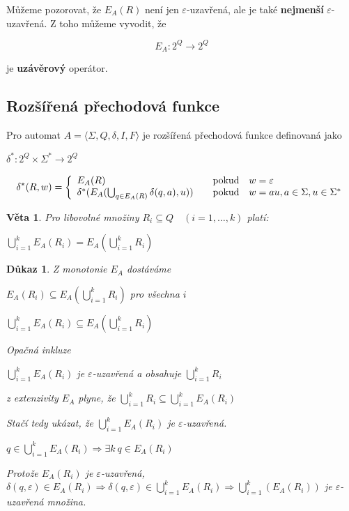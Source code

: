 \documentclass[10pt, a4paper, titlepage]{article}
\theoremstyle{note}
\newtheorem{veta}{Věta}
\newtheorem{dukaz}{Důkaz}
\begin{document}
Můžeme pozorovat, že $E_A(R)$ není jen $\varepsilon$-uzavřená, ale je také \textbf{nejmenší} $\varepsilon$-uzavřená. Z toho můžeme vyvodit, že 

$$E_A:2^Q \rightarrow 2^Q$$

je \textbf{uzávěrový} operátor.

\subsection{Rozšířená přechodová funkce}

Pro automat $A = \langle \Sigma,Q,\delta,I,F \rangle$ je rozšířená přechodová funkce definovaná jako

$\delta^*:2^Q \times \Sigma^* \rightarrow 2^Q$

$$
\delta^*(R,w)=\left\{
\begin{array}{l@{\quad\mbox{}\quad}l}
E_A(R) & \text{pokud}\quad w=\varepsilon\\
\delta^*(E_A(\bigcup_{q \in E_A(R)}\delta(q,a),u))& \text{pokud}\quad w=au,a\in\Sigma,u\in\Sigma^*\\
\end{array}
\right.
$$

\begin{veta}
Pro libovolné množiny $R_i \subseteq Q \quad (i=1,\ldots,k)$ platí:

$\bigcup_{i=1}^k E_A(R_i)=E_A(\bigcup_{i=1}^kR_i)$
\end{veta}

\begin{dukaz}
Z monotonie $E_A$ dostáváme

\quad$E_A(R_i) \subseteq E_A(\bigcup_{i=1}^k R_i)$ pro všechna $i$

\quad$\bigcup_{i=1}^kE_A(R_i) \subseteq E_A(\bigcup_{i=1}^k R_i)$

Opačná inkluze

\quad$\bigcup_{i=1}^kE_A(R_i)$ je $\varepsilon$-uzavřená a obsahuje $\bigcup_{i=1}^k R_i$

z extenzivity $E_A$ plyne, že $\bigcup_{i=1}^k R_i \subseteq \bigcup_{i=1}^k E_A(R_i)$

Stačí tedy ukázat, že $\bigcup_{i=1}^k E_A(R_i)$ je $\varepsilon$-uzavřená.

\quad$q \in \bigcup_{i=1}^k E_A(R_i) \Rightarrow \exists k \ q \in E_A(R_i)$

Protože $E_A(R_i)$ je $\varepsilon$-uzavřená, $\delta(q,\varepsilon) \in E_A(R_i) \Rightarrow \delta(q,\varepsilon) \in \bigcup_{i=1}^k E_A(R_i) \Rightarrow \bigcup_{i=1}^k(E_A(R_i))$ je $\varepsilon$-uzavřená množina.
\end{dukaz}
\end{document}
